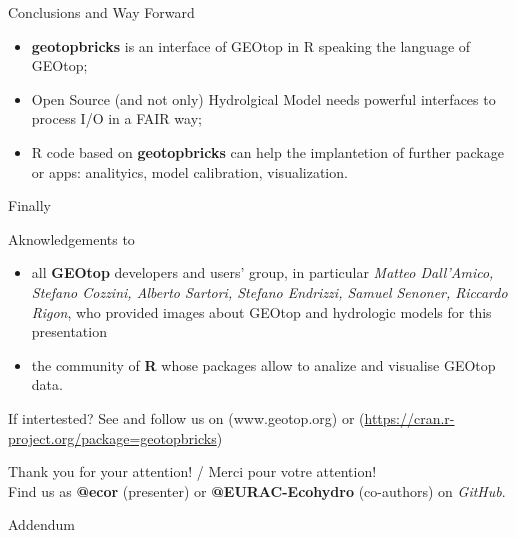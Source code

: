 \documentclass[ignorenonframetext,]{beamer}
\providecommand{\tightlist}{%
  \setlength{\itemsep}{0pt}\setlength{\parskip}{0pt}}
\begin{document}
\begin{frame}{Conclusions and Way Forward}

\begin{itemize}
\item
  \textbf{geotopbricks} is an interface of GEOtop in R speaking the
  language of GEOtop;
\item
  Open Source (and not only) Hydrolgical Model needs powerful interfaces
  to process I/O in a FAIR way;
\item
  R code based on \textbf{geotopbricks} can help the implantetion of
  further package or apps: analityics, model calibration, visualization.
\end{itemize}

\end{frame}

\begin{frame}{Finally}

Aknowledgements to

\begin{itemize}
\tightlist
\item
  all \textbf{GEOtop} developers and users' group, in particular
  \emph{Matteo Dall'Amico, Stefano Cozzini, Alberto Sartori, Stefano
  Endrizzi, Samuel Senoner, Riccardo Rigon}, who provided images about
  GEOtop and hydrologic models for this presentation
\item
  the community of \textbf{R} whose packages allow to analize and
  visualise GEOtop data.
\end{itemize}

If intertested? See and follow us on (www.geotop.org) or
(\url{https://cran.r-project.org/package=geotopbricks})

Thank you for your attention! / Merci pour votre attention!\\
Find us as \textbf{@ecor} (presenter) or \textbf{@EURAC-Ecohydro}
(co-authors) on \emph{GitHub}.

\end{frame}

\begin{frame}{Addendum}

\end{frame}
\end{document}
